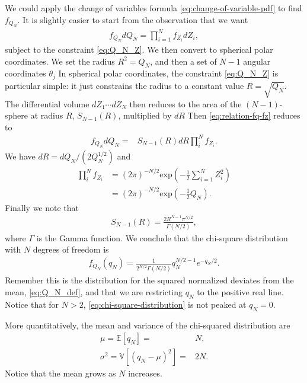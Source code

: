 We could apply the change of variables formula \eqref{eq:change-of-variable-pdf}
to find $f_{Q_N}$.
It is slightly easier to start from the observation that we want
\begin{align}
    \label{eq:relation-fq-fz}
    f_{Q_N}d Q_N
    =
    \prod_{i=1}^N f_{Z_i} dZ_i
    ,
\end{align}
subject to the constraint \eqref{eq:Q_N_Z}.
We then convert to spherical polar coordinates. 
We set the radius $R^2=Q_N$, and then a set of $N-1$ angular coordinates $\theta_j$ 
In spherical polar coordinates,
the constraint \eqref{eq:Q_N_Z} is particular simple: it just constrains the
radius to a constant value $R=\sqrt{Q_N}$. The differential volume 
$dZ_1\cdots dZ_N$ then reduces to the area of the $(N-1)$-sphere at radius $R$, $S_{N-1}\left(R\right)$, 
multiplied by $dR$
Then \eqref{eq:relation-fq-fz} reduces to
\begin{align}
    f_{Q_N}dQ_N
    =&
    S_{N-1}\left(R\right) dR \prod_i^N f_{Z_i}
    .
\end{align}
We have $dR = dQ_N / (2 Q_N^{1/2})$ and
\begin{align}
    \prod_i^N f_{Z_i}
    &=
    \left(2\pi\right)^{-N/2} 
    \mathrm{exp}\left(
        -\frac{1}{2}\sum_{i=1}^NZ_i^2
    \right)
    \nonumber\\
    &=
    \left(2\pi\right)^{-N/2} 
    \mathrm{exp}\left(
        -\frac{1}{2}Q_N
    \right)
    .
\end{align}
Finally we note that
\begin{align}
    S_{N-1}\left(R\right)
    =
    \frac{2R^{N-1}\pi^{N/2}}{\Gamma\left(N/2\right)}
    ,
\end{align}
where $\Gamma$ is the Gamma function.
We conclude that the chi-square distribution with $N$ degrees of freedom is
\begin{align}
    \label{eq:chi-square-distribution}
    f_{Q_N}\left(q_N\right)
    =
    \frac{1}{2^{N/2}\Gamma\left(N/2\right)}q_N^{N/2-1} e^{-q_N/2}
    .
\end{align}
Remember this is the distribution for the squared normalized deviates from the mean, \eqref{eq:Q_N_def},
and that we are restricting $q_N$ to the positive real line.
Notice that for $N>2$, \eqref{eq:chi-square-distribution} is not peaked at $q_N=0$. 

More quantitatively, the mean and variance of the chi-squared distribution are
\begin{align}
    \mu
    =
    \mathbb{E}\left[q_N\right]
    =&
    N
    ,\\
    \sigma^2
    =
    \mathbb{V}\left[\left(q_N-\mu\right)^2\right]
    =&
    2N
    .
\end{align}
Notice that the mean grows as $N$ increases.
